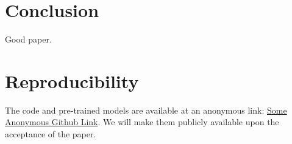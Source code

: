 
\section{Conclusion}
\label{sec:conclusion}
Good paper. 



\section*{Reproducibility}
The code and pre-trained models are available at an anonymous link: \url{Some Anonymous Github Link}. 
We will make them publicly available upon the acceptance of the paper. 
